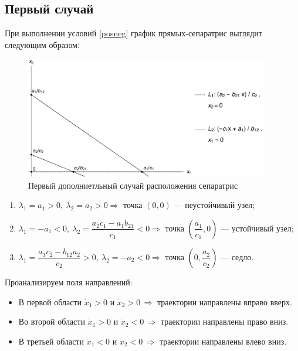 \documentclass[12pt,a4paper]{article}
\begin{document}
    \subsection{Первый случай}
    При выполнении условий \eqref{posneg} график прямых-сепаратрис выглядит следующим образом:
    \begin{figure}[h]
        \centering
        \includegraphics[width=0.95\textwidth]{sep_3.pdf}
        \caption{Первый дополниетльный случай расположения сепаратрис}
        \label{fig:sep_3}
    \end{figure}
    \begin{enumerate}
        \setlength\itemsep{0.5em}
        \item $ \lambda_1 = a_1 > 0,\ \lambda_2 = a_2 > 0 \Rightarrow $ точка $ (0, 0) $ --- неустойчивый узел;
    
        \item $ \lambda_1 = -a_1 < 0,\ \lambda_2 = \dfrac{a_2 c_1 - a_1 b_{21}}{c_1} < 0 \Rightarrow $ точка $ \left( \dfrac{a_1}{c_1}, 0 \right) $ --- устойчивый узел;
        
        \item  $ \lambda_1 = \dfrac{a_1 c_2 - b_{12} a_2}{c_2} > 0,\ \lambda_2 = -a_2 < 0 \Rightarrow $ точка $ \left( 0, \dfrac{a_2}{c_2} \right) $ --- седло.
        \\[0.05em]
    \end{enumerate}

    Проанализируем поля направлений:

    \begin{itemize}
        \setlength\itemsep{0.4em}
        \item В первой области $ \dot x_1 > 0 $ и $ \dot x_2 > 0 \, \Rightarrow $ траектории направлены вправо вверх.
        \item Во второй области $ \dot x_1 > 0 $ и $ \dot x_2 < 0 \, \Rightarrow $ траектории направлены право вниз.
        \item В третьей области $ \dot x_1 < 0 $ и $ \dot x_2 < 0 \, \Rightarrow $ траектории направлены влево вниз.
    \end{itemize}
\end{document}
